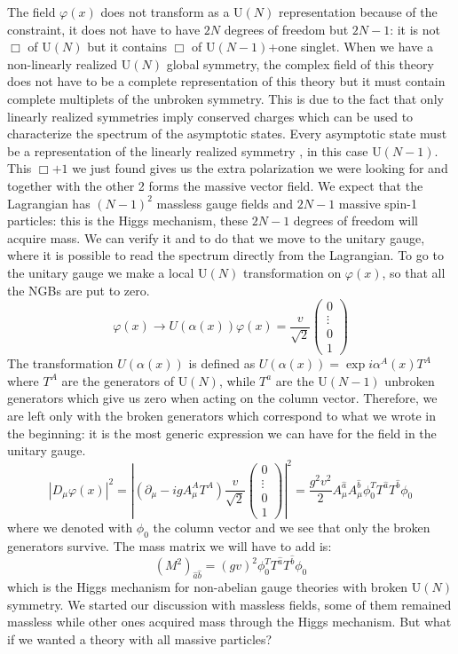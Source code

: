 \documentclass[../main.tex]{subfiles}
\begin{document}
The field $\varphi(x)$ does not transform as a U$(N)$ representation because of the constraint, it does not have to have $2N$ degrees of freedom but $2N-1$: it is not $\Box$ of U$(N)$ but it contains $\Box$ of U$(N-1)$+one singlet. When we have a non-linearly realized U$(N)$ global symmetry, the complex field of this theory does not have to be a complete representation of this theory but it must contain complete multiplets of the unbroken symmetry. This is due to the fact that only linearly realized symmetries imply conserved charges which can be used to characterize the spectrum of the asymptotic states. Every asymptotic state must be a representation of the linearly realized symmetry , in this case U$(N-1)$. This $\Box+1$ we just found gives us the extra polarization we were looking for and together with the other 2 forms the massive vector field. We expect that the Lagrangian has $(N-1)^2$ massless gauge fields and $2N-1$ massive spin-1 particles: this is the Higgs mechanism, these $2N-1$ degrees of freedom will acquire mass. We can verify it and to do that we move to the unitary gauge, where it is possible to read the spectrum directly from the Lagrangian. To go to the unitary gauge we make a local U$(N)$ transformation on $\varphi(x)$, so that all the NGBs are put to zero.
\[
\varphi(x)\to U(\alpha(x))\varphi(x)=\frac{v}{\sqrt{2}}\begin{pmatrix}
    0\\
    \vdots\\
    0\\
    1
\end{pmatrix}
\]
The transformation $U(\alpha(x))$ is defined as $U(\alpha(x))=\exp{i\alpha^A(x)T^A}$ where $T^A$ are the generators of U$(N)$, while $T^a$ are the U$(N-1)$ unbroken generators which give us zero when acting on the column vector. Therefore, we are left only with the broken generators which correspond to what we wrote in the beginning: it is the most generic expression we can have for the field in the unitary gauge.
\[
|D_\mu\varphi(x)|^2=\left|(\partial_\mu-igA_\mu^AT^A)\frac{v}{\sqrt{2}}\begin{pmatrix}
    0\\
    \vdots\\
    0\\1
\end{pmatrix}\right|^2=\frac{g^2v^2}{2}A_\mu^{\hat{a}}A_\mu^{\hat{b}}\phi_0^TT^{\hat{a}}T^{\hat{b}}\phi_0
\]
where we denoted with $\phi_0$ the column vector and we see that only the broken generators survive. The mass matrix we will have to add is:
\[
(M^2)_{\hat{a}\hat{b}}=(gv)^2\phi_0^TT^{\hat{a}}T^{\hat{b}}\phi_0
\]
which is the Higgs mechanism for non-abelian gauge theories with broken U$(N)$ symmetry. We started our discussion with massless fields, some of them remained massless while other ones acquired mass through the Higgs mechanism. But what if we wanted a theory with all massive particles? 
\end{document}
